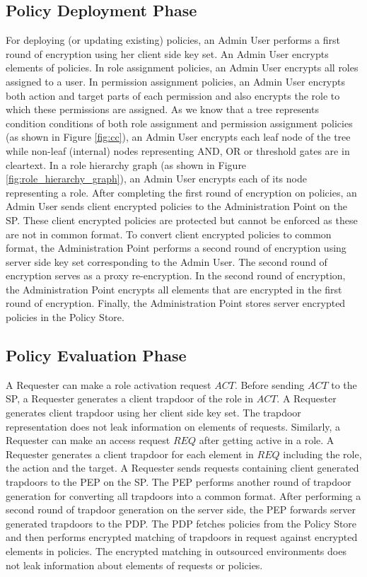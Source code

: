 \documentclass[final,5p,times,twocolumn]{elsarticle}
\begin{document}
\subsection{Policy Deployment Phase}

For deploying (or updating existing) policies, an Admin User performs a first round of encryption using her client side key set. An Admin User encrypts elements of policies. In role assignment policies, an Admin User encrypts all roles assigned to a user. In permission assignment policies, an Admin User encrypts both action and target parts of each permission and also encrypts the role to which these permissions are assigned. As we know that a tree represents condition conditions of both role assignment and permission assignment policies (as shown in Figure \ref{fig:cc}), an Admin User encrypts each leaf node of the tree while non-leaf (internal) nodes representing AND, OR or threshold gates are in cleartext. In a role hierarchy graph (as shown in Figure \ref{fig:role_hierarchy_graph}), an Admin User encrypts each of its node representing a role. After completing the first round of encryption on policies, an Admin User sends client encrypted policies to the Administration Point on the SP. These client encrypted policies are protected but cannot be enforced as these are not in common format. To convert client encrypted policies to common format, the Administration Point performs a second round of encryption using server side key set corresponding to the Admin User. The second round of encryption serves as a proxy re-encryption. In the second round of encryption, the Administration Point encrypts all elements that are encrypted in the first round of encryption. Finally, the Administration Point stores server encrypted policies in the Policy Store.

\subsection{Policy Evaluation Phase}

A Requester can make a role activation request $\mathit{ACT}$. Before sending $\mathit{ACT}$ to the SP, a Requester generates a client trapdoor of the role in $\mathit{ACT}$. A Requester generates client trapdoor using her client side key set. The trapdoor representation does not leak information on elements of requests. Similarly, a Requester can make an access request $\mathit{REQ}$ after getting active in a role. A Requester generates a client trapdoor for each element in $\mathit{REQ}$ including the role, the action and the target. A Requester sends requests containing client generated trapdoors to the PEP on the SP. The PEP performs another round of trapdoor generation for converting all trapdoors into a common format. After performing a second round of trapdoor generation on the server side, the PEP forwards server generated trapdoors to the PDP. The PDP fetches policies from the Policy Store and then performs encrypted matching of trapdoors in request against encrypted elements in policies. The encrypted matching in outsourced environments does not leak information about elements of requests or policies. 
\end{document}

